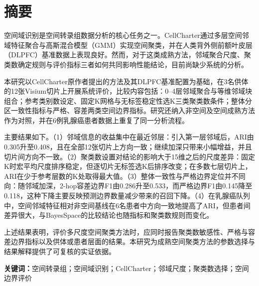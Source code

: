 \section*{摘要}

空间域识别是空间转录组数据分析的核心任务之一。CellCharter通过多层空间邻域特征聚合与高斯混合模型（GMM）实现空间聚类，并在人类背外侧前额叶皮层（DLPFC）基准数据上表现良好\cite{varrone2024}。然而，对于这类成熟方法，邻域聚合尺度、聚类数确定规则与评价指标三者如何共同影响性能结论，目前尚缺少系统的分析。

本研究以CellCharter原作者提出的方法及其DLPFC基准配置为基础，在3名供体的12张Visium切片上开展系统评价，比较内容包括：0--4层邻域聚合与等维邻域块组合；参考类别数设定、固定K网格与无标签稳定性选K三类聚类数条件；整体分区一致性指标与严格、容差两类空间边界指标。研究还纳入非空间及空间成熟方法作为对照，并在6例乳腺癌患者数据上重复了同一分析流程。

主要结果如下。（1）邻域信息的收益集中在最近邻层：引入第一层邻域后，ARI由0.305升至0.408，且在全部12张切片上方向一致；继续加深只带来小幅增益，并且切片间方向不一致。（2）聚类数设置对结论的影响大于15维之后的尺度差异：固定K时宏平均尺度排序稳定，但逐切片无标签选K后排序改变；在多数七层切片上，ARI在少于参考层数的K处取得最大值。（3）整体一致性与严格边界定位并不同向：随邻域加深，2-hop容差边界F1由0.286升至0.533，而严格边界F1由0.145降至0.118，这种下降主要反映预测边界数量减少带来的召回下降。（4）在乳腺癌队列中，空间邻域特征相对非空间基线在6名患者中方向一致地提高了ARI，但患者间差异很大，与BayesSpace的比较结论也随指标和聚类数规则而变化。

上述结果表明，评价多尺度空间聚类方法时，应同时报告聚类数敏感性、严格与容差边界指标以及供体或患者层面的结果。本研究为成熟空间聚类方法的参数选择与结果解释提供了可复核的实证依据。

\noindent\textbf{关键词：}空间转录组；空间域识别；CellCharter；邻域尺度；聚类数选择；空间边界评价
